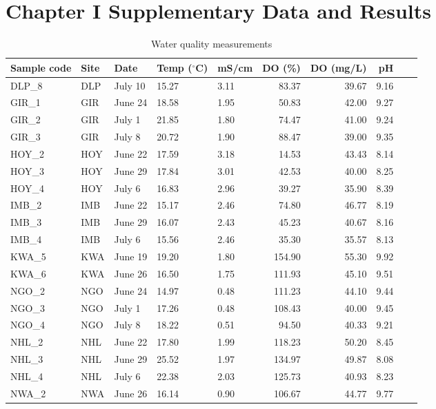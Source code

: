 \section{Chapter I Supplementary Data and Results}



\small
\begin{longtable}{lllllrrrrr}
\caption{Water quality measurements}
\label{tab:water_qual}\\
  \hline
  Sample code & Site & Date & Temp ($^{\circ}$C) & mS/cm & DO (\%) & DO (mg/L) & pH \\ 
  \hline
  DLP\_8 & DLP & July 10 & 15.27 & 3.11 & 83.37 & 39.67 & 9.16 \\ 
  GIR\_1 & GIR & June 24 & 18.58 & 1.95 & 50.83 & 42.00 & 9.27 \\ 
  GIR\_2 & GIR & July 1 & 21.85 & 1.80 & 74.47 & 41.00 & 9.24 \\ 
  GIR\_3 & GIR & July 8 & 20.72 & 1.90 & 88.47 & 39.00 & 9.35 \\ 
  HOY\_2 & HOY & June 22 & 17.59 & 3.18 & 14.53 & 43.43 & 8.14 \\ 
  HOY\_3 & HOY & June 29 & 17.84 & 3.01 & 42.53 & 40.00 & 8.25 \\ 
  HOY\_4 & HOY & July 6 & 16.83 & 2.96 & 39.27 & 35.90 & 8.39 \\ 
  IMB\_2 & IMB & June 22 & 15.17 & 2.46 & 74.80 & 46.77 & 8.19 \\ 
  IMB\_3 & IMB & June 29 & 16.07 & 2.43 & 45.23 & 40.67 & 8.16 \\ 
  IMB\_4 & IMB & July 6 & 15.56 & 2.46 & 35.30 & 35.57 & 8.13 \\ 
  KWA\_5 & KWA & June 19 & 19.20 & 1.80 & 154.90 & 55.30 & 9.92 \\ 
  KWA\_6 & KWA & June 26 & 16.50 & 1.75 & 111.93 & 45.10 & 9.51 \\ 
  NGO\_2 & NGO & June 24 & 14.97 & 0.48 & 111.23 & 44.10 & 9.44 \\ 
  NGO\_3 & NGO & July 1 & 17.26 & 0.48 & 108.43 & 40.00 & 9.45 \\ 
  NGO\_4 & NGO & July 8 & 18.22 & 0.51 & 94.50 & 40.33 & 9.21 \\ 
  NHL\_2 & NHL & June 22 & 17.80 & 1.99 & 118.23 & 50.20 & 8.45 \\ 
  NHL\_3 & NHL & June 29 & 25.52 & 1.97 & 134.97 & 49.87 & 8.08 \\ 
  NHL\_4 & NHL & July 6 & 22.38 & 2.03 & 125.73 & 40.93 & 8.23 \\ 
  NWA\_2 & NWA & June 26 & 16.14 & 0.90 & 106.67 & 44.77 & 9.77 \\ 

\end{longtable}
